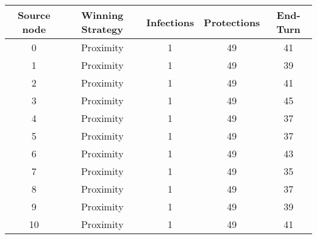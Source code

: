 \documentclass[results.tex]{subfiles}
\begin{document}
    \begin{center}
        \begin{tabular}{| c || c | c | c | c |}
            \hline
            {\bfseries Source node} & {\bfseries Winning Strategy} & {\bfseries Infections} & {\bfseries Protections}
            & {\bfseries End-Turn}
            \\  %
            \hline\hline
            0                       & Proximity                    & 1                      & 49                      & 41                   \\
            \hline
            1                       & Proximity                    & 1                      & 49                      & 39                   \\
            \hline
            2                       & Proximity                    & 1                      & 49                      & 41                   \\
            \hline
            3                       & Proximity                    & 1                      & 49                      & 45                   \\
            \hline
            4                       & Proximity                    & 1                      & 49                      & 37                   \\
            \hline
            5                       & Proximity                    & 1                      & 49                      & 37                   \\
            \hline
            6                       & Proximity                    & 1                      & 49                      & 43                   \\
            \hline
            7                       & Proximity                    & 1                      & 49                      & 35                   \\
            \hline
            8                       & Proximity                    & 1                      & 49                      & 37                   \\
            \hline
            9                       & Proximity                    & 1                      & 49                      & 39                   \\
            \hline
            10                      & Proximity                    & 1                      & 49                      & 41                   \\

\end{tabular}
\end{center}
\end{document}
